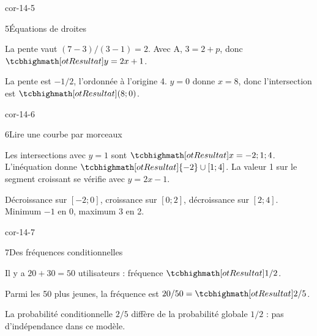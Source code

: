 \begin{blocLivre}{cor-14-5}
\begin{corrige}{5}{Équations de droites}
\begin{questions}
\item La pente vaut $(7-3)/(3-1)=2$. Avec A, $3=2+p$, donc $\res{y=2x+1}$.
\item La pente est $-1/2$, l’ordonnée à l’origine 4. $y=0$ donne $x=8$, donc l’intersection est $\res{(8;0)}$.
\end{questions}
\label{figlivre-r14-05-droites-cor}

\end{corrige}
\end{blocLivre}
\begin{blocLivre}{cor-14-6}
\begin{corrige}{6}{Lire une courbe par morceaux}
\begin{questions}
\item Les intersections avec $y=1$ sont $\res{x=-2;1;4}$. L’inéquation donne $\res{\{-2\}\cup[1;4]}$. La valeur 1 sur le segment croissant se vérifie avec $y=2x-1$.
\item Décroissance sur $[-2;0]$, croissance sur $[0;2]$, décroissance sur $[2;4]$. Minimum $-1$ en 0, maximum 3 en 2.
\end{questions}
\label{figlivre-r14-06-lecture-cor}

\end{corrige}
\end{blocLivre}
\begin{blocLivre}{cor-14-7}
\begin{corrige}{7}{Des fréquences conditionnelles}
\begin{questions}
\item Il y a $20+30=50$ utilisateurs : fréquence $\res{1/2}$.
\item Parmi les 50 plus jeunes, la fréquence est $20/50=\res{2/5}$.
\item La probabilité conditionnelle $2/5$ diffère de la probabilité globale $1/2$ : pas d’indépendance dans ce modèle.
\end{questions}
\label{figlivre-r14-07-cor}

\end{corrige}
\end{blocLivre}
